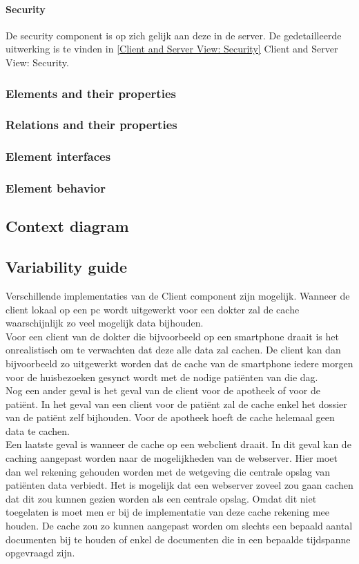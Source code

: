 \documentclass[a4paper,10pt]{paper}
\begin{document}
\paragraph{Security}
De security component is op zich gelijk aan deze in de server.  De gedetailleerde uitwerking is te vinden in \ref{Client and Server View: Security} Client and Server View: Security.


\subsubsection{Elements and their properties}

\subsubsection{Relations and their properties}

\subsubsection{Element interfaces}

\subsubsection{Element behavior}

\subsection{Context diagram}

\subsection{Variability guide}
Verschillende implementaties van de Client component zijn mogelijk.  Wanneer de client lokaal op een pc wordt uitgewerkt voor een dokter zal de cache waarschijnlijk zo veel mogelijk data bijhouden.\\
Voor een client van de dokter die bijvoorbeeld op een smartphone draait is het onrealistisch om te verwachten dat deze alle data zal cachen.  De client kan dan bijvoorbeeld zo uitgewerkt worden dat de cache van de smartphone iedere morgen voor de huisbezoeken gesynct wordt met de nodige pati\"{e}nten van die dag.\\
Nog een ander geval is het geval van de client voor de apotheek of voor de pati\"{e}nt.  In het geval van een client voor de pati\"{e}nt zal de cache enkel het dossier van de pati\"{e}nt zelf bijhouden.  Voor de apotheek hoeft de cache helemaal geen data te cachen.\\
Een laatste geval is wanneer de cache op een webclient draait.  In dit geval kan de caching aangepast worden naar de mogelijkheden van de webserver.  Hier moet dan wel rekening gehouden worden met de wetgeving die centrale opslag van pati\"{e}nten data verbiedt.  Het is mogelijk dat een webserver zoveel zou gaan cachen dat dit zou kunnen gezien worden als een centrale opslag.  Omdat dit niet toegelaten is moet men er bij de implementatie van deze cache rekening mee houden.  De cache zou zo kunnen aangepast worden om slechts een bepaald aantal documenten bij te houden of enkel de documenten die in een bepaalde tijdspanne opgevraagd zijn.
\end{document}
